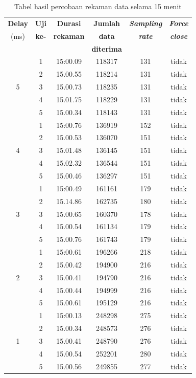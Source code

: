 \begin{table}[H]
	\caption{Tabel hasil percobaan rekaman data selama 15 menit}
	\begin{tabular}{|c|c|c|c|c|c|}
		\hline
		\multicolumn{1}{|c|}{{\color[HTML]{000000} \textbf{Delay}}} & \multicolumn{1}{|c|}{\textbf{Uji}} &
		\multicolumn{1}{|c|}{ \textbf{Durasi}} &
		\multicolumn{1}{|c|}{\textbf{Jumlah}} &
		\multicolumn{1}{|c|}{\textbf{\textit{Sampling}}}  & 
		\multicolumn{1}{|c|}{\textbf{\textit{Force}}} \\
		(ms) &  \textbf{ke-}  & \textbf{rekaman}  & \textbf{data} & \textbf{\textit{rate}}  & \textit{\textbf{close}}\\
		&  &  &  \textbf{diterima} & &  \\ \hline
		
		\multirow{5}{*}{5} &1& 15:00.09 &118317 &131 & tidak \\
		\cline{2-6}&2 &15.00.55 & 118214 &131 & tidak\\ 
		\cline{2-6}&3 &15.00.73 & 118235 &131 & tidak\\ 
		\cline{2-6}&4 &15.01.75 & 118229 &131 & tidak\\ 
		\cline{2-6}&5 &15.00.34 & 118143 &131 & tidak\\ 
		\hline
		\multirow{5}{*}{4} &1& 15:00.76 &136919 &152 & tidak \\
		\cline{2-6}&2 &15.00.53 & 136070 &151 & tidak\\ 
		\cline{2-6}&3 &15.01.48 & 136145 &151 & tidak\\ 
		\cline{2-6}&4 &15.02.32 & 136544 &151 & tidak\\ 
		\cline{2-6}&5 &15.00.46 & 136297 &151 & tidak\\ 
		\hline
		\multirow{5}{*}{3} &1& 15:00.49 &161161 &179 & tidak \\
		\cline{2-6}&2 &15.14.86 & 162735 &180 & tidak\\ 
		\cline{2-6}&3 &15.00.65 & 160370 &178 & tidak\\ 
		\cline{2-6}&4 &15.00.54 & 161134 &179 & tidak\\ 
		\cline{2-6}&5 &15.00.76 & 161743 &179 & tidak\\ 
		\hline
		\multirow{5}{*}{2} &1& 15:00.61 &196266 &218 & tidak \\
		\cline{2-6}&2 &15.00.42 & 194900 &216 & tidak\\ 
		\cline{2-6}&3 &15.00.41 & 194790 &216 & tidak\\ 
		\cline{2-6}&4 &15.00.44 & 194999 &216 & tidak\\ 
		\cline{2-6}&5 &15.00.61 & 195129 &216 & tidak\\ 
		\hline
		\multirow{5}{*}{1} &1& 15:00.13 &248298 &275 & tidak \\
		\cline{2-6}&2 &15.00.34 & 248573 &276 & tidak\\ 
		\cline{2-6}&3 &15.00.41 & 248790 &276 & tidak\\ 
		\cline{2-6}&4 &15.00.54 & 252201 &280 & tidak\\ 
		\cline{2-6}&5 &15.00.56 & 249855 &277 & tidak\\ 
		\hline
	\end{tabular}
	\vspace{1ex}
	

\end{table}
